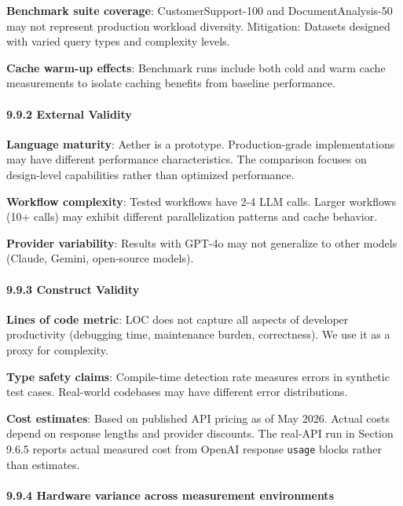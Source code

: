 \documentclass[
]{article}
\newcommand{\passthrough}[1]{#1}
\begin{document}
\textbf{Benchmark suite coverage}: CustomerSupport-100 and
DocumentAnalysis-50 may not represent production workload diversity.
Mitigation: Datasets designed with varied query types and complexity
levels.

\textbf{Cache warm-up effects}: Benchmark runs include both cold and
warm cache measurements to isolate caching benefits from baseline
performance.

\paragraph{9.9.2 External Validity}\label{external-validity}

\textbf{Language maturity}: Aether is a prototype. Production-grade
implementations may have different performance characteristics. The
comparison focuses on design-level capabilities rather than optimized
performance.

\textbf{Workflow complexity}: Tested workflows have 2-4 LLM calls.
Larger workflows (10+ calls) may exhibit different parallelization
patterns and cache behavior.

\textbf{Provider variability}: Results with GPT-4o may not generalize to
other models (Claude, Gemini, open-source models).

\paragraph{9.9.3 Construct Validity}\label{construct-validity}

\textbf{Lines of code metric}: LOC does not capture all aspects of
developer productivity (debugging time, maintenance burden,
correctness). We use it as a proxy for complexity.

\textbf{Type safety claims}: Compile-time detection rate measures errors
in synthetic test cases. Real-world codebases may have different error
distributions.

\textbf{Cost estimates}: Based on published API pricing as of May 2026.
Actual costs depend on response lengths and provider discounts. The
real-API run in Section 9.6.5 reports actual measured cost from OpenAI
response \passthrough{\lstinline!usage!} blocks rather than estimates.

\paragraph{9.9.4 Hardware variance across measurement
environments}\label{hardware-variance-across-measurement-environments}
\end{document}
